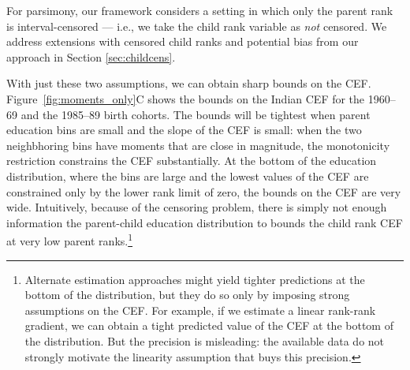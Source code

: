 \documentclass[12pt,letterpaper]{article}
\numberwithin{equation}{section}
\begin{document}
For parsimony, our framework considers a setting in which only the parent rank is interval-censored --- i.e., we take the child rank variable as \textit{not} censored. We address extensions with censored child ranks and potential bias from our approach in Section \ref{sec:childcens}.

With just these two assumptions, we can obtain sharp bounds on the CEF. Figure~\ref{fig:moments_only}C shows the bounds on the Indian CEF for the 1960--69 and the 1985--89 birth cohorts. The bounds will be tightest when parent education bins are small and the slope of the CEF is small: when the two neighbhoring bins have moments that are close in magnitude, the monotonicity restriction constrains the CEF substantially. At the bottom of the education distribution, where the bins are large and the lowest values of the CEF are constrained only by the lower rank limit of zero, the bounds on the CEF are very wide. Intuitively, because of the censoring problem, there is simply not enough information the parent-child education distribution to bounds the child rank CEF at very low parent ranks.\footnote{Alternate estimation approaches might yield tighter predictions at the bottom of the distribution, but they do so only by imposing strong assumptions on the CEF. For example, if we estimate a linear rank-rank gradient, we can obtain a tight predicted value of the CEF at the bottom of the distribution. But the precision is misleading: the available data do not strongly motivate the linearity assumption that buys this precision.}
\end{document}
